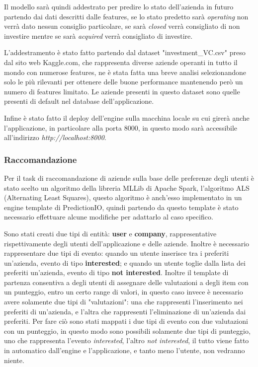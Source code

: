 Il modello sarà quindi addestrato per predire lo stato dell'azienda in futuro partendo dai dati descritti dalle features, se lo stato predetto sarà \textit{operating} non verrà dato nessun consiglio particolare, se sarà \textit{closed} verrà consigliato di non investire mentre se sarà \textit{acquired} verrà consigliato di investire.

L'addestramento è stato fatto partendo dal dataset "investment\_VC.csv" \cite{dataset} preso dal sito web Kaggle.com, che rappresenta diverse aziende operanti in tutto il mondo con numerose features, ne è stata fatta una breve analisi selezionandone solo le più rilevanti per ottenere delle buone performance mantenendo però un numero di features limitato. Le aziende presenti in questo dataset sono quelle presenti di default nel database dell'applicazione.

Infine è stato fatto il deploy dell'engine sulla macchina locale su cui girerà anche l'applicazione, in particolare alla porta 8000, in questo modo sarà accessibile all'indirizzo \textit{http://localhost:8000}.

\subsubsection{Raccomandazione}\label{subsubsec:racc}
Per il task di raccomandazione di aziende sulla base delle preferenze degli utenti è stato scelto un algoritmo della libreria MLLib di Apache Spark, l'algoritmo ALS (Alternating Least Squares), questo algoritmo è anch'esso implementato in un engine template di PredictionIO, quindi partendo da questo template è stato necessario effettuare alcune modifiche per adattarlo al caso specifico. 

Sono stati creati due tipi di entità: \textbf{user} e \textbf{company}, rappresentative rispettivamente degli utenti dell'applicazione e delle aziende. Inoltre è necessario rappresentare due tipi di evento: quando un utente inserisce tra i preferiti un'azienda, evento di tipo \textbf{interested}; e quando un utente toglie dalla lista dei preferiti un'azienda, evento di tipo \textbf{not interested}. Inoltre il template di partenza consentiva a degli utenti di assegnare delle valutazioni a degli item con un punteggio, entro un certo range di valori, in questo caso invece è necessario avere solamente due tipi di "valutazioni": una che rappresenti l'inserimento nei preferiti di un'azienda, e l'altra che rappresenti l'eliminazione di un'azienda dai preferiti. Per fare ciò sono stati mappati i due tipi di evento con due valutazioni con un punteggio, in questo modo sono possibili solamente due tipi di punteggio, uno che rappresenta l'evento \textit{interested}, l'altro \textit{not interested}, il tutto viene fatto in automatico dall'engine e l'applicazione, e tanto meno l'utente, non vedranno niente.


